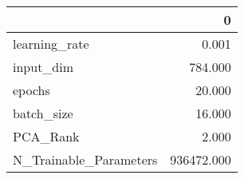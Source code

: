 \begin{tabular}{lr}
\toprule
{} &           0 \\
\midrule
learning\_rate          &       0.001 \\
input\_dim              &     784.000 \\
epochs                 &      20.000 \\
batch\_size             &      16.000 \\
PCA\_Rank               &       2.000 \\
N\_Trainable\_Parameters &  936472.000 \\
\bottomrule
\end{tabular}
